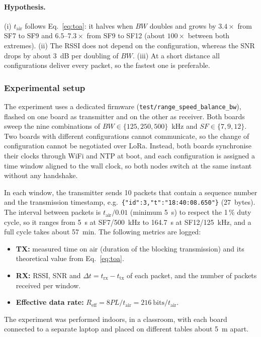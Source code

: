 \documentclass[informe,english]{plantilla}
\begin{document}
\paragraph{Hypothesis.} (i) $t_{\text{air}}$ follows Eq.~\eqref{eq:toa}: it halves when $BW$ doubles and grows by $3.4\times$ from SF7 to SF9 and $6.5$--$7.3\times$ from SF9 to SF12 (about $100\times$ between both extremes). (ii) The RSSI does not depend on the configuration, whereas the SNR drops by about 3~dB per doubling of $BW$. (iii) At a short distance all configurations deliver every packet, so the fastest one is preferable.

\subsubsection{Experimental setup}

The experiment uses a dedicated firmware (\texttt{test/range\_speed\_balance\_bw}), flashed on one board as transmitter and on the other as receiver. Both boards sweep the nine combinations of $BW \in \{125, 250, 500\}$~kHz and $SF \in \{7, 9, 12\}$. Two boards with different configurations cannot communicate, so the change of configuration cannot be negotiated over LoRa. Instead, both boards synchronise their clocks through WiFi and NTP at boot, and each configuration is assigned a time window aligned to the wall clock, so both nodes switch at the same instant without any handshake.

In each window, the transmitter sends 10 packets that contain a sequence number and the transmission timestamp, e.g.\ \texttt{\{"id":3,"t":"18:40:08.650"\}} (27~bytes). The interval between packets is $t_{\text{air}}/0.01$ (minimum 5~s) to respect the 1\,\% duty cycle, so it ranges from 5~s at SF7/500~kHz to 164.7~s at SF12/125~kHz, and a full cycle takes about 57~min. The following metrics are logged:
\begin{itemize}[noitemsep]
    \item \textbf{TX:} measured time on air (duration of the blocking transmission) and its theoretical value from Eq.~\eqref{eq:toa}.
    \item \textbf{RX:} RSSI, SNR and $\Delta t = t_{\text{rx}} - t_{\text{tx}}$ of each packet, and the number of packets received per window.
    \item \textbf{Effective data rate:} $R_{\text{eff}} = 8PL/t_{\text{air}} = 216~\text{bits}/t_{\text{air}}$.
\end{itemize}

The experiment was performed indoors, in a classroom, with each board connected to a separate laptop and placed on different tables about 5~m apart.
\end{document}
